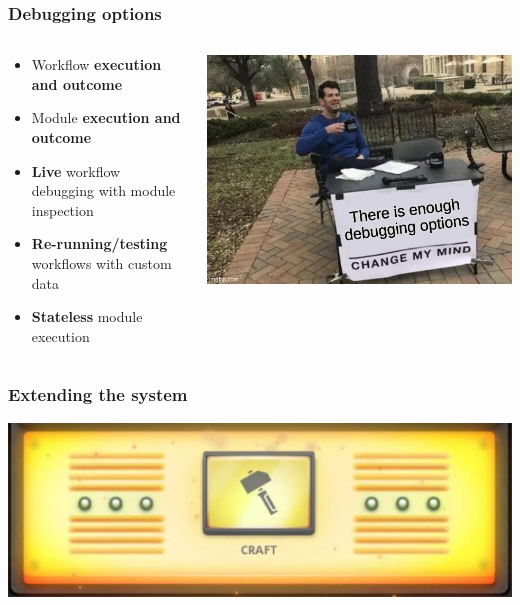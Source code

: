 \begin{frame}
    \frametitle{Debugging options}
    \begin{columns}
        \begin{column}{0.6\textwidth}
            \begin{itemize}
                \item Workflow \textbf{execution and outcome}
                \item Module \textbf{execution and outcome}
                \item \textbf{Live} workflow debugging with module inspection
                \item \textbf{Re-running/testing} workflows with custom data
                \item \textbf{Stateless} module execution
            \end{itemize}
        \end{column}
        \begin{column}{0.4\textwidth}
            \includegraphics[width=1.0\linewidth]{pictures/enough-debugging.jpg}
        \end{column}
    \end{columns}
\end{frame}

\begin{frame}
    \frametitle{
        \huge
        \linebreak
        \linebreak
        \linebreak
        Extending the system
        \vspace{1em}
    }
    \begin{center}
        \includegraphics[width=0.6\linewidth]{pictures/craft.jpg}
    \end{center}
\end{frame}

